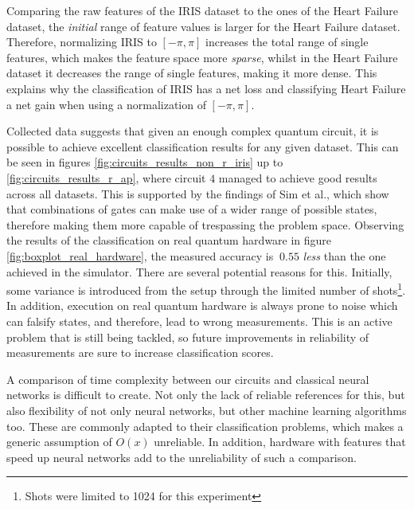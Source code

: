 Comparing the raw features of the IRIS dataset to the ones of the Heart Failure dataset, the \emph{initial} range of feature values is larger for the Heart Failure dataset. Therefore, normalizing IRIS to $[-\pi,\pi]$ increases the total range of single features, which makes the feature space more \emph{sparse}, whilst in the Heart Failure dataset it decreases the range of single features, making it more dense. This explains why the classification of IRIS has a net loss and classifying Heart Failure a net gain when using a normalization of $[-\pi, \pi]$. \par
Collected data suggests that given an enough complex quantum circuit, it is possible to achieve excellent classification results for any given dataset. This can be seen in figures \ref{fig:circuits_results_non_r_iris} up to \ref{fig:circuits_results_r_ap}, where circuit $4$ managed to achieve good results across all datasets. This is supported by the findings of Sim et al.\cite{sim_expressibility_2019}, which show that combinations of gates can make use of a wider range of possible states, therefore making them more capable of trespassing the problem space.
Observing the results of the classification on real quantum hardware in figure \ref{fig:boxplot_real_hardware}, the measured accuracy is $~0.55$ \emph{less} than the one achieved in the simulator. There are several potential reasons for this. Initially, some variance is introduced from the setup through the limited number of shots\footnote{Shots were limited to 1024 for this experiment}. In addition, execution on real quantum hardware is always prone to noise which can falsify states, and therefore, lead to wrong measurements. This is an active problem that is still being tackled\cite{georgopoulos_modelling_2021,shaib_efficient_2021}, so future improvements in reliability of measurements are sure to increase classification scores.\par
A comparison of time complexity between our circuits and classical neural networks is difficult to create. Not only the lack of reliable references for this, but also flexibility of not only neural networks, but other machine learning algorithms too. These are commonly adapted to their classification problems, which makes a generic assumption of $O(x)$ unreliable. In addition, hardware with features that speed up neural networks\cite{baischer_learning_2021} add to the unreliability of such a comparison.

\clearpage
